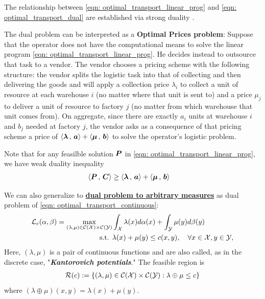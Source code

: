 \documentclass[11pt]{article}
\begin{document}
The relationship between \eqref{eqn: optimal_transport_linear_prog} and \eqref{eqn: optimal_transport_dual} are established via strong duality \citep{bertsimas1997introduction}.  

The dual problem can be interpreted as a \textbf{Optimal Prices problem}: Suppose that the operator does not have the computational
means to solve the linear program \eqref{eqn: optimal_transport_linear_prog}. He decides instead to outsource that task to a vendor. The vendor chooses a pricing scheme with the following structure: the vendor splits the logistic task into that of collecting and then delivering the goods and will apply a collection price $\lambda_i$ to collect a unit of resource at each warehouse $i$ (no matter where that unit is sent to) and a price $\mu_j$ to deliver a unit of resource to factory $j$ (no matter from which warehouse that unit comes from). On aggregate, since there are exactly $a_i$ units at warehouse $i$ and $b_j$ needed at factory $j$, the vendor asks as a consequence of that pricing scheme a price of $\left\langle \boldsymbol{\lambda}\,,\, \boldsymbol{a} \right\rangle + \left\langle \boldsymbol{\mu}\,,\, \boldsymbol{b} \right\rangle$ to solve the operator’s logistic problem.

Note that for any feasilble solution $\boldsymbol{P}$ in \eqref{eqn: optimal_transport_linear_prog}, we have weak duality inequality
\begin{align*}
\left\langle \boldsymbol{P}\,,\, \boldsymbol{C} \right\rangle &\ge \left\langle \boldsymbol{\lambda}\,,\, \boldsymbol{a} \right\rangle + \left\langle \boldsymbol{\mu}\,,\, \boldsymbol{b} \right\rangle
\end{align*}

We can also generalize to  \underline{\textbf{dual problem to arbitrary measures}} as dual problem of \eqref{eqn: optimal_transport_continuous}: 
\begin{align}
{\mathcal L}_{c}(\alpha, \beta) = \max_{(\lambda,  \mu) \in {\mathcal C}({\mathcal X})\times {\mathcal C}({\mathcal Y})} & \int_{{\mathcal X}}\lambda(x) d\alpha(x) + \int_{{\mathcal Y}}\mu(y) d\beta(y) \label{eqn: optimal_transport_dual_cont} \\
\text{s.t. }&  \lambda(x) + \mu(y) \le c(x, y),\quad \forall x\in {\mathcal X}, y \in {\mathcal Y}, \label{eqn: optimal_transport_dual_cont_constraint}
\end{align} Here, $(\lambda, \mu)$ is a pair of continuous functions and are also called, as in the discrete case, "\textbf{\emph{Kantorovich potentials}}." The feasible region is 
 \begin{align}
{\mathcal R}(c) := \left\{(\lambda,  \mu) \in  {\mathcal C}({\mathcal X})\times {\mathcal C}({\mathcal Y}): \lambda \oplus \mu \le c\right\} \label{eqn: optimal_transport_dual_cont_feasible_set}
\end{align} where $( \lambda \oplus \mu)(x, y)=  \lambda(x) + \mu(y)$.
\end{document}

